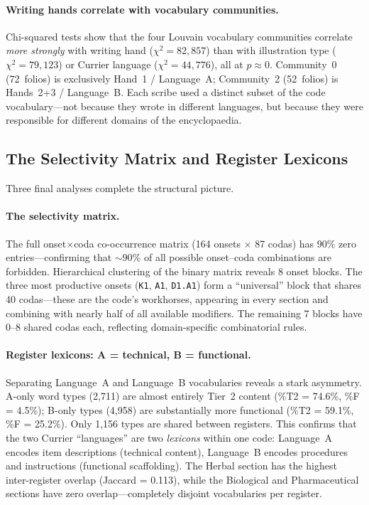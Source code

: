 \paragraph{Writing hands correlate with vocabulary communities.}
Chi-squared tests show that the four Louvain vocabulary communities correlate \emph{more strongly} with writing hand ($\chi^2 = 82{,}857$) than with illustration type ($\chi^2 = 79{,}123$) or Currier language ($\chi^2 = 44{,}776$), all at $p \approx 0$.  Community~0 (72~folios) is exclusively Hand~1 / Language~A; Community~2 (52~folios) is Hands~2+3 / Language~B.  Each scribe used a distinct subset of the code vocabulary---not because they wrote in different languages, but because they were responsible for different domains of the encyclopaedia.

\subsection{The Selectivity Matrix and Register Lexicons}

Three final analyses complete the structural picture.

\paragraph{The selectivity matrix.}
The full onset$\times$coda co-occurrence matrix (164 onsets $\times$ 87 codas) has 90\% zero entries---confirming that $\sim$90\% of all possible onset--coda combinations are forbidden.  Hierarchical clustering of the binary matrix reveals 8 onset blocks.  The three most productive onsets (\texttt{K1}, \texttt{A1}, \texttt{D1.A1}) form a ``universal'' block that shares 40 codas---these are the code's workhorses, appearing in every section and combining with nearly half of all available modifiers.  The remaining 7 blocks have 0--8 shared codas each, reflecting domain-specific combinatorial rules.

\paragraph{Register lexicons: A = technical, B = functional.}
Separating Language~A and Language~B vocabularies reveals a stark asymmetry.  A-only word types (2,711) are almost entirely Tier~2 content (\%T2 = 74.6\%, \%F = 4.5\%); B-only types (4,958) are substantially more functional (\%T2 = 59.1\%, \%F = 25.2\%).  Only 1,156 types are shared between registers.  This confirms that the two Currier ``languages'' are two \emph{lexicons} within one code: Language~A encodes item descriptions (technical content), Language~B encodes procedures and instructions (functional scaffolding).  The Herbal section has the highest inter-register overlap (Jaccard = 0.113), while the Biological and Pharmaceutical sections have zero overlap---completely disjoint vocabularies per register.

